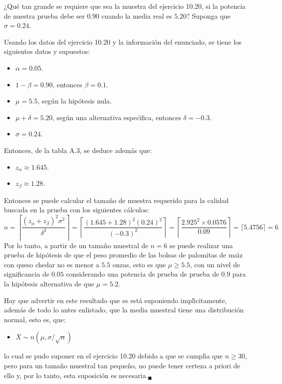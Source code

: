 \begin{enunciado}
 ¿Qu\'e tan grande se requiere que sea la muestra del ejercicio 10.20, si la potencia de nuestra prueba debe ser $0.90$ cuando la media real es $5.20$? Suponga que $\sigma = 0.24$.
\end{enunciado}

\begin{solucion}
 Usando los datos del ejercicio 10.20
 y la informaci\'on del enunciado,
 se tiene los siguientes datos y supuestos:
 \begin{itemize}
  \item $\alpha = 0.05$.
  \item $1 - \beta = 0.90$, entonces $\beta = 0.1$.
  \item $\mu = 5.5$, seg\'un la hip\'otesis nula.
  \item $\mu + \delta = 5.20$,
  seg\'un una alternativa espec\'{\i}fica,
  entonces $\delta = -0.3$.
  \item $\sigma = 0.24$.
 \end{itemize}
 Entonces, de la tabla A.3, se deduce adem\'as que:
 \begin{itemize}
  \item $z_{\alpha} \approx 1.645$.
  \item $z_{\beta} \approx 1.28$.
 \end{itemize}

 Entonces se puede calcular el tama\~no de muestra requerido
 para la calidad buscada en la prueba
 con los siguientes c\'alculos:
 \begin{equation*}
  n =
  \left\lceil
  \frac{(z_{\alpha} + z_{\beta})^2 \sigma^2}{\delta^2}
  \right\rceil
  = \left\lceil
  \frac{(1.645 + 1.28)^2 (0.24)^2}{(-0.3)^2}
  \right\rceil
  = \left\lceil \frac{2.925^2 \times 0.0576}{0.09} \right\rceil
  = \lceil 5.4756 \rceil = 6
 \end{equation*}
 Por lo tanto, a partir de un tama\~no muestral de $n = 6$ se puede realizar una prueba de hip\'otesis
 de que el peso promedio de las bolsas de palomitas de ma\'{\i}z con queso chedar no es menor a $5.5$ onzas,
 esto es que $\mu \geq 5.5$, con un nivel de significancia de $0.05$
 considerando una potencia de prueba de prueba de $0.9$ para la hip\'otesis alternativa de que $\mu = 5.2$.
 \par
 Hay que advertir en este resultado que es est\'a suponiendo impl\'{\i}citamente,
 adem\'as de todo lo antes enlistado, que la media muestral tiene una distribuci\'on normal, esto es, que:
 \begin{itemize}
  \item $\overline{X} \sim n\left( \mu, \sigma/\sqrt{n} \right)$
 \end{itemize}
 lo cual se pudo suponer en el ejercicio 10.20 debido a que se cumpl\'{\i}a que $n \geq 30$,
 pero para un tama\~no muestral tan peque\~no, no puede tener certeza a priori de ello
 y, por lo tanto, esta suposici\'on es necesaria.${}_{\blacksquare}$
\end{solucion}
